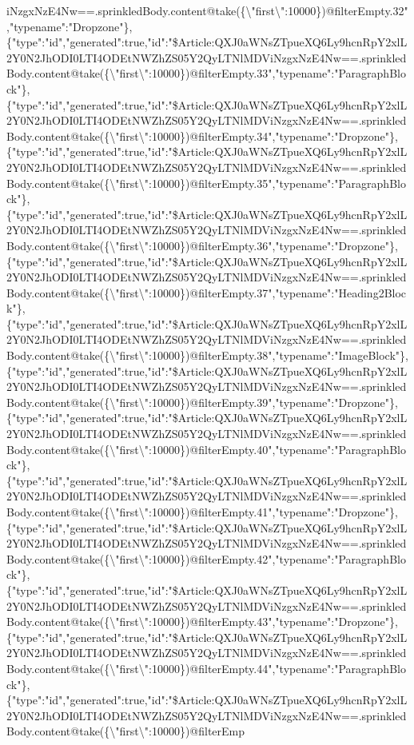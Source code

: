 iNzgxNzE4Nw==.sprinkledBody.content@take(\{\textbackslash{}"first\textbackslash{}":10000\})@filterEmpty.32","typename":"Dropzone"\},\{"type":"id","generated":true,"id":"\$Article:QXJ0aWNsZTpueXQ6Ly9hcnRpY2xlL2Y0N2JhODI0LTI4ODEtNWZhZS05Y2QyLTNlMDViNzgxNzE4Nw==.sprinkledBody.content@take(\{\textbackslash{}"first\textbackslash{}":10000\})@filterEmpty.33","typename":"ParagraphBlock"\},\{"type":"id","generated":true,"id":"\$Article:QXJ0aWNsZTpueXQ6Ly9hcnRpY2xlL2Y0N2JhODI0LTI4ODEtNWZhZS05Y2QyLTNlMDViNzgxNzE4Nw==.sprinkledBody.content@take(\{\textbackslash{}"first\textbackslash{}":10000\})@filterEmpty.34","typename":"Dropzone"\},\{"type":"id","generated":true,"id":"\$Article:QXJ0aWNsZTpueXQ6Ly9hcnRpY2xlL2Y0N2JhODI0LTI4ODEtNWZhZS05Y2QyLTNlMDViNzgxNzE4Nw==.sprinkledBody.content@take(\{\textbackslash{}"first\textbackslash{}":10000\})@filterEmpty.35","typename":"ParagraphBlock"\},\{"type":"id","generated":true,"id":"\$Article:QXJ0aWNsZTpueXQ6Ly9hcnRpY2xlL2Y0N2JhODI0LTI4ODEtNWZhZS05Y2QyLTNlMDViNzgxNzE4Nw==.sprinkledBody.content@take(\{\textbackslash{}"first\textbackslash{}":10000\})@filterEmpty.36","typename":"Dropzone"\},\{"type":"id","generated":true,"id":"\$Article:QXJ0aWNsZTpueXQ6Ly9hcnRpY2xlL2Y0N2JhODI0LTI4ODEtNWZhZS05Y2QyLTNlMDViNzgxNzE4Nw==.sprinkledBody.content@take(\{\textbackslash{}"first\textbackslash{}":10000\})@filterEmpty.37","typename":"Heading2Block"\},\{"type":"id","generated":true,"id":"\$Article:QXJ0aWNsZTpueXQ6Ly9hcnRpY2xlL2Y0N2JhODI0LTI4ODEtNWZhZS05Y2QyLTNlMDViNzgxNzE4Nw==.sprinkledBody.content@take(\{\textbackslash{}"first\textbackslash{}":10000\})@filterEmpty.38","typename":"ImageBlock"\},\{"type":"id","generated":true,"id":"\$Article:QXJ0aWNsZTpueXQ6Ly9hcnRpY2xlL2Y0N2JhODI0LTI4ODEtNWZhZS05Y2QyLTNlMDViNzgxNzE4Nw==.sprinkledBody.content@take(\{\textbackslash{}"first\textbackslash{}":10000\})@filterEmpty.39","typename":"Dropzone"\},\{"type":"id","generated":true,"id":"\$Article:QXJ0aWNsZTpueXQ6Ly9hcnRpY2xlL2Y0N2JhODI0LTI4ODEtNWZhZS05Y2QyLTNlMDViNzgxNzE4Nw==.sprinkledBody.content@take(\{\textbackslash{}"first\textbackslash{}":10000\})@filterEmpty.40","typename":"ParagraphBlock"\},\{"type":"id","generated":true,"id":"\$Article:QXJ0aWNsZTpueXQ6Ly9hcnRpY2xlL2Y0N2JhODI0LTI4ODEtNWZhZS05Y2QyLTNlMDViNzgxNzE4Nw==.sprinkledBody.content@take(\{\textbackslash{}"first\textbackslash{}":10000\})@filterEmpty.41","typename":"Dropzone"\},\{"type":"id","generated":true,"id":"\$Article:QXJ0aWNsZTpueXQ6Ly9hcnRpY2xlL2Y0N2JhODI0LTI4ODEtNWZhZS05Y2QyLTNlMDViNzgxNzE4Nw==.sprinkledBody.content@take(\{\textbackslash{}"first\textbackslash{}":10000\})@filterEmpty.42","typename":"ParagraphBlock"\},\{"type":"id","generated":true,"id":"\$Article:QXJ0aWNsZTpueXQ6Ly9hcnRpY2xlL2Y0N2JhODI0LTI4ODEtNWZhZS05Y2QyLTNlMDViNzgxNzE4Nw==.sprinkledBody.content@take(\{\textbackslash{}"first\textbackslash{}":10000\})@filterEmpty.43","typename":"Dropzone"\},\{"type":"id","generated":true,"id":"\$Article:QXJ0aWNsZTpueXQ6Ly9hcnRpY2xlL2Y0N2JhODI0LTI4ODEtNWZhZS05Y2QyLTNlMDViNzgxNzE4Nw==.sprinkledBody.content@take(\{\textbackslash{}"first\textbackslash{}":10000\})@filterEmpty.44","typename":"ParagraphBlock"\},\{"type":"id","generated":true,"id":"\$Article:QXJ0aWNsZTpueXQ6Ly9hcnRpY2xlL2Y0N2JhODI0LTI4ODEtNWZhZS05Y2QyLTNlMDViNzgxNzE4Nw==.sprinkledBody.content@take(\{\textbackslash{}"first\textbackslash{}":10000\})@filterEmp